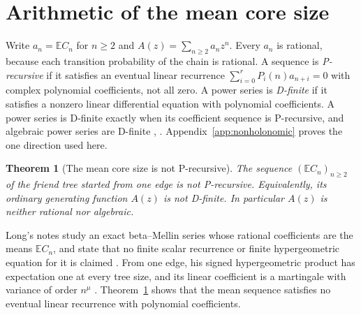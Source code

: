 \documentclass[11pt]{article}
\newtheorem{theorem}{Theorem}
\newcommand{\resulttag}{?}
\newcommand{\tagnext}[1]{\renewcommand{\resulttag}{#1}}
\theoremstyle{remark}
\newcommand{\E}{\mathbb E}
\begin{document}
\section{Arithmetic of the mean core size}\label{sec:arith}
Write $a_n=\E C_n$ for $n\ge2$ and $A(z)=\sum_{n\ge2}a_nz^n$. Every $a_n$ is rational, because each transition probability of the chain is rational. A sequence is \emph{P-recursive} if it satisfies an eventual linear recurrence $\sum_{i=0}^rP_i(n)a_{n+i}=0$ with complex polynomial coefficients, not all zero. A power series is \emph{D-finite} if it satisfies a nonzero linear differential equation with polynomial coefficients. A power series is D-finite exactly when its coefficient sequence is P-recursive, and algebraic power series are D-finite \cite{Stanley}, \cite[Proposition~6.4.3 and Theorem~6.4.6]{EC2}. Appendix~\ref{app:nonholonomic} proves the one direction used here.

\tagnext{PREC}
\begin{theorem}[The mean core size is not P-recursive]\label{th:nonholonomic}
The sequence $(\E C_n)_{n\ge2}$ of the friend tree started from one edge is not P-recursive. Equivalently, its ordinary generating function $A(z)$ is not D-finite. In particular $A(z)$ is neither rational nor algebraic.
\end{theorem}
Long's notes study an exact beta--Mellin series whose rational coefficients are the means $\E C_n$, and state that no finite scalar recurrence or finite hypergeometric equation for it is claimed \cite{LongRepo}. From one edge, his signed hypergeometric product has expectation one at every tree size, and its linear coefficient is a martingale with variance of order $n^\mu$ \cite{LongProduct}. Theorem~\ref{th:nonholonomic} shows that the mean sequence satisfies no eventual linear recurrence with polynomial coefficients.
\end{document}
